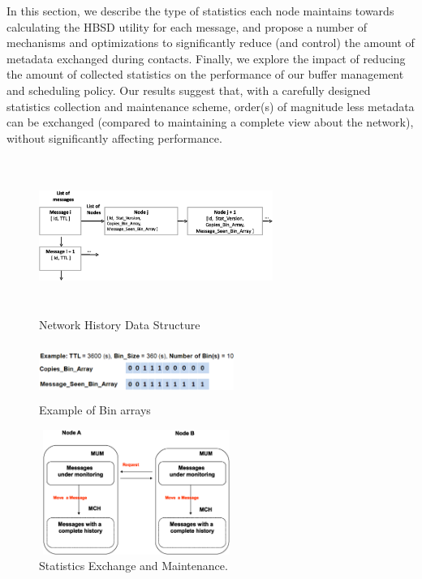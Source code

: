 In this section, we describe the type of statistics each node maintains towards calculating the HBSD utility for each message, and propose a number of mechanisms and optimizations to significantly reduce (and control) the amount of metadata exchanged during contacts. Finally, we explore the impact of reducing the amount of collected statistics on the performance of our buffer management and scheduling policy. Our results suggest that, with a carefully designed statistics collection and maintenance scheme, order(s) of magnitude less metadata can be exchanged (compared to maintaining a complete view about the network), without significantly affecting performance.

\begin{figure}[!h]
\centering
\includegraphics[width=3in,height=2in]{Chapitre3/Stat_Matrix.eps}
\caption{Network History Data Structure}
\label{NHM}
\end{figure}
\begin{figure}
\centering
\includegraphics[width=2.5in,height=0.7in]{Chapitre3/Bin_Array.eps}
\caption{Example of Bin arrays}
\label{BA}
\end{figure}

\begin{figure}[!h]
\centering
\includegraphics[width=2.5in,height=1.6in]{Chapitre3/StatisticsExchanging.eps}
\caption{Statistics Exchange and Maintenance.}
\label{SE}
\end{figure}

